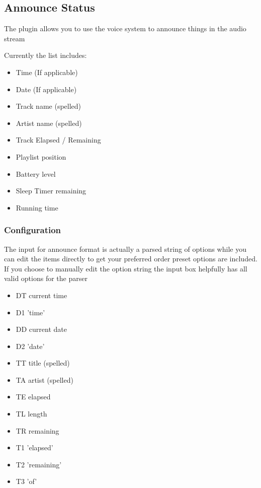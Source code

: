 \subsection{Announce Status}

The  plugin allows you to use the voice system to announce things in the audio stream

Currently the list includes:
\begin{itemize}
\item Time (If applicable)
\item Date (If applicable)
\item Track name (spelled)
\item Artist name (spelled)
\item Track Elapsed / Remaining
\item Playlist position
\item Battery level
\item Sleep Timer remaining
\item Running time
\end{itemize}

\subsubsection{Configuration}
The input for announce format is actually a parsed string of options
while you can edit the items directly to get your preferred order preset options are included.
If you choose to manually edit the option string the input box helpfully has all valid options for the parser


\begin{itemize}
\item DT current time
\item D1 'time'
\item DD current date
\item D2 'date'
\end{itemize}

\begin{itemize}
\item TT title (spelled)
\item TA artist (spelled)
\item TE elapsed
\item TL length
\item TR remaining
\item T1 'elapsed'
\item T2 'remaining'
\item T3 'of'
\end{itemize}

